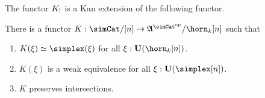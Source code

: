 \documentclass[csh.tex]{subfiles}
\begin{document}

The functor $K_!$ is a Kan extension of the following functor.

\begin{lemma} There is a functor $K\of \simCat/[n]\to\ambient\s/\horn_k[n]$ such that 
\begin{enumerate}
\item $K(\xi)\simeq\simplex(\xi)$ for all $\xi\of\base(\horn_k[n])$.
\item $K(\xi)$ is a weak equivalence for all $\xi\of\base(\simplex[n])$.
\item $K$ preserves intersections.
\end{enumerate} \label{the functor K}
\end{lemma}
\end{document}
